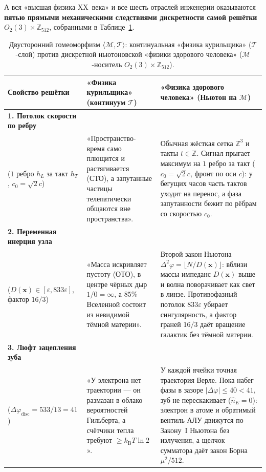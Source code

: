 А вся «высшая физика XX~века» и все шесть отраслей инженерии оказываются \textbf{пятью прямыми механическими следствиями дискретности самой решётки $O_2(3)\times\mathbb{Z}_{512}$}, собранными в Таблице~\ref{tab:course-smoker-vs-healthy}.

\begin{table}[htbp]
\centering
\caption{Двусторонний гомеоморфизм $\langle\mathcal{M},\mathcal{T}\rangle$: континуальная «физика курильщика» ($\mathcal{T}$-слой) против дискретной ньютоновской «физики здорового человека» ($\mathcal{M}$-носитель $O_2(3)\times\mathbb{Z}_{512}$).}
\label{tab:course-smoker-vs-healthy}
\footnotesize
\begin{tabular}{@{}p{}p{}p{}@{}}
\toprule
\textbf{Свойство решётки} & \textbf{«Физика курильщика» (континуум $\mathcal{T}$)} & \textbf{«Физика здорового человека» (Ньютон на $\mathcal{M}$)} \\
\midrule
\textbf{1. Потолок скорости по ребру}\\ ($1$ ребро $h_L$ за такт $h_T$, $c_0=\sqrt{2}c$) &
«Пространство-время само плющится и растягивается (СТО), а запутанные частицы телепатически общаются вне пространства». &
Обычная жёсткая сетка $\mathbb{Z}^3$ и такты $t\in\mathbb{Z}$. Сигнал прыгает максимум на $1$ ребро за такт ($c_0=\sqrt{2}c$, фронт по оси $c$): у бегущих часов часть тактов уходит на перенос, а фаза запутанности бежит по рёбрам со скоростью $c_0$. \\
\addlinespace[3pt]
\textbf{2. Переменная инерция узла}\\ ($D(\mathbf{x})\in[\varepsilon,833\varepsilon]$, фактор $16/3$) &
«Масса искривляет пустоту (ОТО), в центре чёрных дыр $1/0=\infty$, а $85\%$ Вселенной состоит из невидимой тёмной материи». &
Второй закон Ньютона $\Delta^2\varphi = \lfloor N/D(\mathbf{x})\rfloor$: вблизи массы импеданс $D(\mathbf{x})$ выше и волна поворачивает как свет в линзе. Противофазный потолок $833\varepsilon$ убирает сингулярность, а фактор граней $16/3$ даёт вращение галактик без тёмной материи. \\
\addlinespace[3pt]
\textbf{3. Люфт зацепления зуба}\\ ($\Delta\varphi_{\mathrm{disc}} = 533/13 = 41$) &
«У электрона нет траектории --- он размазан в облако вероятностей Гильберта, а счётчики тепла требуют $\ge k_{\mathrm{B}}T\ln 2$». &
У каждой ячейки точная траектория Верле. Пока набег фазы в зазоре $|\Delta\varphi|\le 40 < 41$, зуб не перескакивает ($\hat{n}_E=0$): электрон в атоме и обратимый вентиль АЛУ движутся по Закону~I Ньютона без излучения, а щелчок сумматора даёт закон Борна $\mu^2/512$. \\

\end{tabular}
\end{table}
